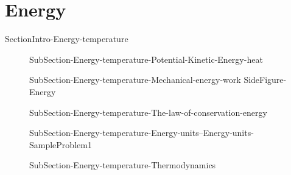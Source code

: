 \documentclass[main.tex]{subfiles}
\newcommand\chapterlabel{Ch-thermochemistry}\setcounter{figurenewcounter}{0}\setcounter{tablenewcounter}{0}\setcounter{formulanewcounter}{0}
\begin{document}





\section{Energy}
{SectionIntro-Energy-temperature}
\sloppy\begin{description}
\item[] {SubSection-Energy-temperature-Potential-Kinetic-Energy-heat}
\item[] {SubSection-Energy-temperature-Mechanical-energy-work}
{SideFigure-Energy}
\item[]
{SubSection-Energy-temperature-The-law-of-conservation-energy}
\item[] {SubSection-Energy-temperature-Energy-units--Energy-units-}
{SampleProblem1}
\item[] {SubSection-Energy-temperature-Thermodynamics}%
\end{description}
\end{document}
